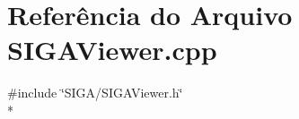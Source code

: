 \section{Referência do Arquivo S\+I\+G\+A\+Viewer.\+cpp}
\label{_s_i_g_a_viewer_8cpp}
{\ttfamily \#include \char`\"{}S\+I\+G\+A/\+S\+I\+G\+A\+Viewer.\+h\char`\"{}}\\*
